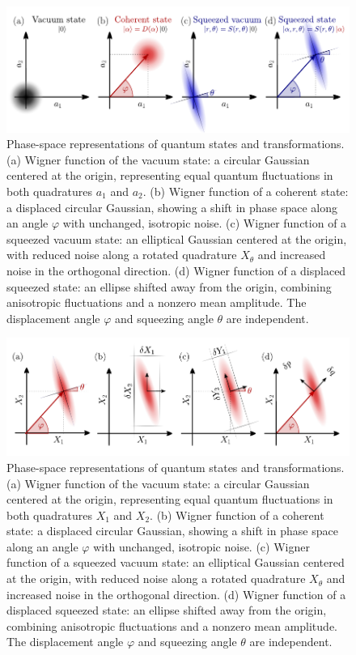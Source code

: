 \begin{figure}
\centering
\includegraphics[width=\textwidth]{./chap2/fig/quantumstates (2).pdf}
\caption{Phase-space representations of quantum states and transformations.
(a) Wigner function of the vacuum state: a circular Gaussian centered at the origin, representing equal quantum fluctuations in both quadratures $a_1$ and $a_2$.
(b) Wigner function of a coherent state: a displaced circular Gaussian, showing a shift in phase space along an angle $\varphi$ with unchanged, isotropic noise.
(c) Wigner function of a squeezed vacuum state: an elliptical Gaussian centered at the origin, with reduced noise along a rotated quadrature $X_\theta$ and increased noise in the orthogonal direction.
(d) Wigner function of a displaced squeezed state: an ellipse shifted away from the origin, combining anisotropic fluctuations and a nonzero mean amplitude. The displacement angle $\varphi$ and squeezing angle $\theta$ are independent.} 
\end{figure}

\begin{figure}
\centering
\includegraphics[width=\textwidth]{./chap2/fig/quadratures_phasespace.pdf}
\caption{Phase-space representations of quantum states and transformations.
(a) Wigner function of the vacuum state: a circular Gaussian centered at the origin, representing equal quantum fluctuations in both quadratures $X_1$ and $X_2$.
(b) Wigner function of a coherent state: a displaced circular Gaussian, showing a shift in phase space along an angle $\varphi$ with unchanged, isotropic noise.
(c) Wigner function of a squeezed vacuum state: an elliptical Gaussian centered at the origin, with reduced noise along a rotated quadrature $X_\theta$ and increased noise in the orthogonal direction.
(d) Wigner function of a displaced squeezed state: an ellipse shifted away from the origin, combining anisotropic fluctuations and a nonzero mean amplitude. The displacement angle $\varphi$ and squeezing angle $\theta$ are independent.} 
\end{figure}


